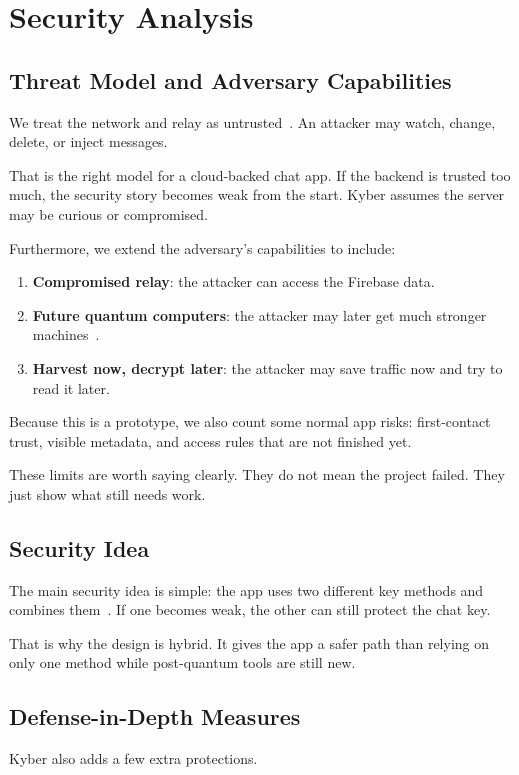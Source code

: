 \section{Security Analysis}

\subsection{Threat Model and Adversary Capabilities}
We treat the network and relay as untrusted~\cite{dolev_yao}. An attacker may watch, change, delete, or inject messages.

That is the right model for a cloud-backed chat app. If the backend is trusted too much, the security story becomes weak from the start. Kyber assumes the server may be curious or compromised.

Furthermore, we extend the adversary's capabilities to include:
\begin{enumerate}
    \item \textbf{Compromised relay}: the attacker can access the Firebase data.
    \item \textbf{Future quantum computers}: the attacker may later get much stronger machines~\cite{shor,grover}.
    \item \textbf{Harvest now, decrypt later}: the attacker may save traffic now and try to read it later.
\end{enumerate}
Because this is a prototype, we also count some normal app risks: first-contact trust, visible metadata, and access rules that are not finished yet.

These limits are worth saying clearly. They do not mean the project failed. They just show what still needs work.

\subsection{Security Idea}
The main security idea is simple: the app uses two different key methods and combines them~\cite{pqxdh}. If one becomes weak, the other can still protect the chat key.

That is why the design is hybrid. It gives the app a safer path than relying on only one method while post-quantum tools are still new.

\subsection{Defense-in-Depth Measures}
Kyber also adds a few extra protections.

